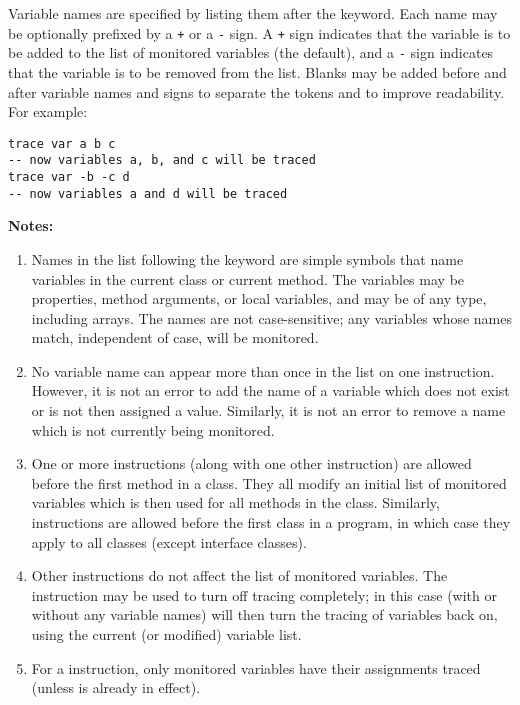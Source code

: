 Variable names are specified by listing them after the 
keyword.
Each name may be optionally prefixed by a \texttt{+} or a \texttt{-} sign.
A \texttt{+} sign indicates that the variable is to be added to the list
of monitored variables (the default), and a \texttt{-} sign indicates that
the variable is to be removed from the list.  Blanks may be added before
and after variable names and signs to separate the tokens and to improve
readability.
 For example:
\begin{lstlisting}
trace var a b c
-- now variables a, b, and c will be traced
trace var -b -c d
-- now variables a and d will be traced
\end{lstlisting}
 \textbf{Notes:}
\begin{enumerate}
\item 
Names in the list following the  keyword are simple symbols
that name variables in the current class or current method.
The variables may be properties, method arguments, or local variables,
and may be of any type, including arrays.
The names are not case-sensitive; any variables whose names match,
independent of case, will be monitored.
\item 
No variable name can appear more than once in the list on one
 instruction.  However, it is not an error to add the
name of a variable which does not exist or is not then assigned a value.
Similarly, it is not an error to remove a name which is not currently
being monitored.
\item 
One or more  instructions (along with one other
 instruction) are allowed before the first method in a
class.  They all modify an initial list of monitored variables which
is then used for all methods in the class.  Similarly,  instructions are allowed before the first class in a program,
in which case they apply to all classes (except interface classes).
\item 
Other  instructions do not affect the list of monitored
variables.
The  instruction may be used to turn off tracing
completely; in this case  (with or without any
variable names) will then turn the tracing of variables back on, using
the current (or modified) variable list.
\item 
For a  instruction, only monitored variables have their
assignments traced (unless  is already in effect).
\end{enumerate}
